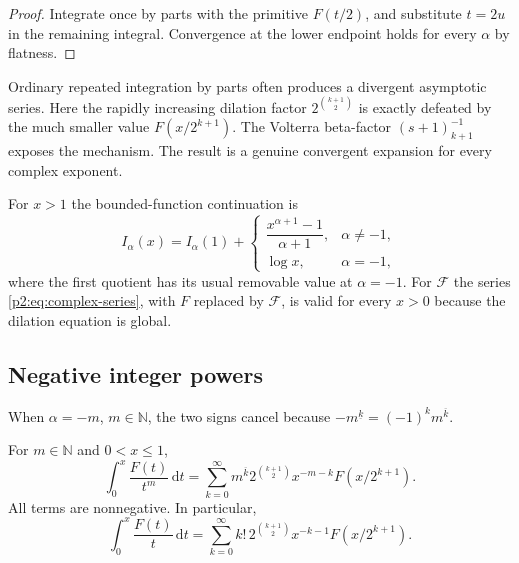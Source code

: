 \documentclass[11pt,oneside]{article}
\theoremstyle{definition}
\theoremstyle{remark}
\newcommand{\N}{\mathbb N}
\newcommand{\dd}{\,\mathrm d}
\newcommand{\fall}[2]{#1^{\underline{#2}}}
\newcommand{\rise}[2]{#1^{\overline{#2}}}
\newcommand{\1}{\mathbf 1}
\begin{document}
\begin{proof}
Integrate once by parts with the primitive $F(t/2)$, and substitute $t=2u$ in
the remaining integral.  Convergence at the lower endpoint holds for every
$\alpha$ by flatness.
\end{proof}

\begin{remark}
Ordinary repeated integration by parts often produces a divergent asymptotic
series.  Here the rapidly increasing dilation factor
$2^{\binom{k+1}{2}}$ is exactly defeated by the much smaller value
$F(x/2^{k+1})$.  The Volterra beta-factor $(s+1)_{k+1}^{-1}$ exposes the
mechanism.  The result is a genuine convergent expansion for every complex
exponent.
\end{remark}

For $x>1$ the bounded-function continuation is
\begin{equation}
 I_\alpha(x)=I_\alpha(1)+
 \begin{cases}
 \dfrac{x^{\alpha+1}-1}{\alpha+1},&\alpha\ne-1,\\[6pt]
 \log x,&\alpha=-1,
 \end{cases}                                               \label{p2:eq:Ialpha-outside}
\end{equation}
where the first quotient has its usual removable value at $\alpha=-1$.  For
$\mathcal F$ the series \eqref{p2:eq:complex-series}, with $F$ replaced by
$\mathcal F$, is valid for every $x>0$ because the dilation equation is global.

\subsection{Negative integer powers}
When $\alpha=-m$, $m\in\N$, the two signs cancel because
$\fall{-m}{k}=(-1)^k\rise{m}{k}$.

\begin{corollary}
\label{p2:cor:negative-series}
For $m\in\N$ and $0<x\le1$,
\begin{equation}
 \boxed{
 \int_0^x\frac{F(t)}{t^m}\dd t
 =\sum_{k=0}^{\infty}\rise{m}{k}
 2^{\binom{k+1}{2}}x^{-m-k}F(x/2^{k+1}).}                 \label{p2:eq:negative-series}
\end{equation}
All terms are nonnegative.  In particular,
\begin{equation}
 \int_0^x\frac{F(t)}t\dd t
 =\sum_{k=0}^{\infty}k!\,2^{\binom{k+1}{2}}
 x^{-k-1}F(x/2^{k+1}).                                    \label{p2:eq:negative-one-series}
\end{equation}
\end{corollary}
\end{document}
